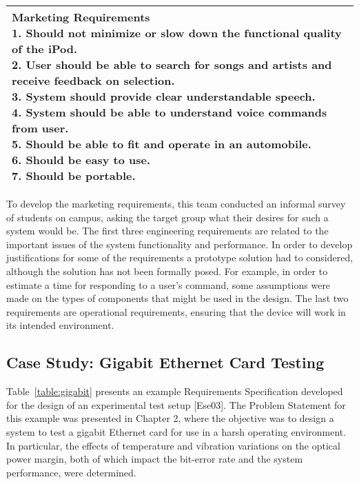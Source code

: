 \begin{table}
\begin{tabular}{ |p{2cm}|p{5cm}|p{5cm}|}
\multicolumn{3}{|p{12cm}|}{
\textbf{Marketing Requirements}\newline
1. Should not minimize or slow down the functional quality of the iPod.\newline
2.  User should be able to search for songs and artists and receive feedback on selection.\newline
3.  System should provide clear understandable speech.\newline
4.  System should be able to understand voice commands from user.\newline
5.  Should be able to fit and operate in an automobile.\newline
6.  Should be easy to use.\newline
7.  Should be portable.
} \\ \hline
\end{tabular}
\end{table}

To develop the marketing requirements, this team conducted an informal
survey of students on campus, asking the target group what their desires
for such a system would be. The first three engineering requirements are
related to the important issues of the system functionality and
performance. In order to develop justifications for some of the
requirements a prototype solution had to considered, although the
solution has not been formally posed. For example, in order to estimate
a time for responding to a user's command, some assumptions were made on
the types of components that might be used in the design. The last two
requirements are operational requirements, ensuring that the device will
work in its intended environment.

\subsection{Case Study: Gigabit Ethernet Card Testing}
\label{subsection:case-study-gigabit-ethernet-card-testing}

Table~\ref{table:gigabit} presents an example Requirements Specification developed for
the design of an experimental test setup {[}Ese03{]}. The Problem
Statement for this example was presented in Chapter 2, where the
objective was to design a system to test a gigabit Ethernet card for use
in a harsh operating environment. In particular, the effects of
temperature and vibration variations on the optical power margin, both
of which impact the bit-error rate and the system performance, were
determined.


